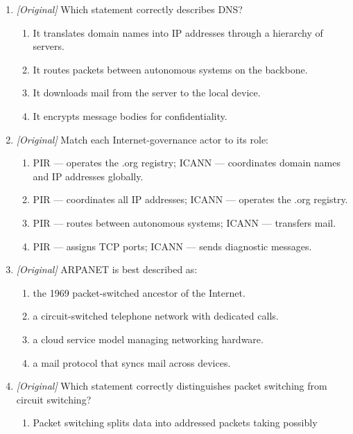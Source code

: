 \begin{enumerate}[label=\textbf{Q\arabic*.}, leftmargin=*]
\begin{enumerate}[label=\Alph*.]
    \item Digital Number Sequence
    \item Direct Node Switch
  \end{enumerate}
\item \textit{[Original]} Which statement correctly describes DNS?
  \begin{enumerate}[label=\Alph*.]
    \item It translates domain names into IP addresses through a hierarchy of
      servers.
    \item It routes packets between autonomous systems on the backbone.
    \item It downloads mail from the server to the local device.
    \item It encrypts message bodies for confidentiality.
  \end{enumerate}
\item \textit{[Original]} Match each Internet-governance actor to its role:
  \begin{enumerate}[label=\Alph*.]
    \item PIR --- operates the .org registry; ICANN --- coordinates domain
      names and IP addresses globally.
    \item PIR --- coordinates all IP addresses; ICANN --- operates the .org
      registry.
    \item PIR --- routes between autonomous systems; ICANN --- transfers mail.
    \item PIR --- assigns TCP ports; ICANN --- sends diagnostic messages.
  \end{enumerate}
\item \textit{[Original]} ARPANET is best described as:
  \begin{enumerate}[label=\Alph*.]
    \item the 1969 packet-switched ancestor of the Internet.
    \item a circuit-switched telephone network with dedicated calls.
    \item a cloud service model managing networking hardware.
    \item a mail protocol that syncs mail across devices.
  \end{enumerate}
\item \textit{[Original]} Which statement correctly distinguishes packet
  switching from circuit switching?
  \begin{enumerate}[label=\Alph*.]
    \item Packet switching splits data into addressed packets taking possibly

\end{enumerate}
\end{enumerate}
